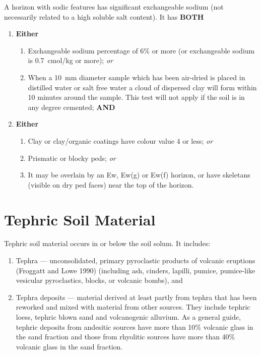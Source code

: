 \documentclass[
  letterpaper,
  DIV=11,
  numbers=noendperiod]{scrreprt}
\providecommand{\tightlist}{%
  \setlength{\itemsep}{0pt}\setlength{\parskip}{0pt}}\usepackage{longtable,booktabs,array}
\begin{document}
A horizon with sodic features has significant exchangeable sodium (not
necessarily related to a high soluble salt content). It has
\textbf{BOTH}

\begin{enumerate}
\def\labelenumi{\arabic{enumi}.}
\tightlist
\item
  \textbf{Either}

  \begin{enumerate}
  \def\labelenumii{(\alph{enumii})}
  \tightlist
  \item
    Exchangeable sodium percentage of 6\% or more (or exchangeable
    sodium is 0.7~cmol/kg or more); \emph{or}
  \item
    When a 10~mm diameter sample which has been air-dried is placed in
    distilled water or salt free water a cloud of dispersed clay will
    form within 10 minutes around the sample. This test will not apply
    if the soil is in any degree cemented; \textbf{AND}
  \end{enumerate}
\item
  \textbf{Either}

  \begin{enumerate}
  \def\labelenumii{(\alph{enumii})}
  \tightlist
  \item
    Clay or clay/organic coatings have colour value 4 or less; \emph{or}
  \item
    Prismatic or blocky peds; \emph{or}
  \item
    It may be overlain by an Ew, Ew(g) or Ew(f) horizon, or have
    skeletans (visible on dry ped faces) near the top of the horizon.
  \end{enumerate}
\end{enumerate}

\hypertarget{sec-diag-teph}{%
\section{Tephric Soil Material}\label{sec-diag-teph}}

Tephric soil material occurs in or below the soil solum. It includes:

\begin{enumerate}
\def\labelenumi{\arabic{enumi}.}
\tightlist
\item
  Tephra --- unconsolidated, primary pyroclastic products of volcanic
  eruptions (Froggatt and Lowe 1990) (including ash, cinders, lapilli,
  pumice, pumice-like vesicular pyroclastics, blocks, or volcanic
  bombs), and
\item
  Tephra deposits --- material derived at least partly from tephra that
  has been reworked and mixed with material from other sources. They
  include tephric loess, tephric blown sand and volcanogenic alluvium.
  As a general guide, tephric deposits from andesitic sources have more
  than 10\% volcanic glass in the sand fraction and those from rhyolitic
  sources have more than 40\% volcanic glass in the sand fraction.
\end{enumerate}
\end{document}
